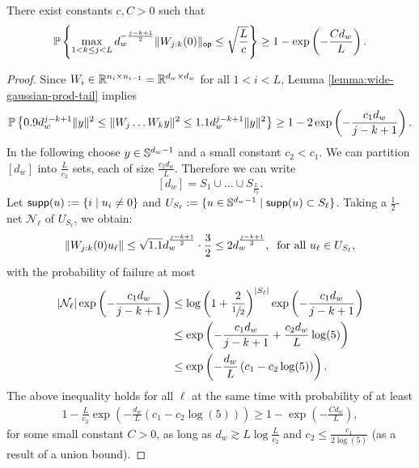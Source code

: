\begin{lemma}
	\label{lemma:norm-product-bounded}
	There exist constants $c,C > 0$ such that
	\begin{equation}
		\mathbb{P}\left\{ {
			\max_{1 < k \leq j < L}
			d_{w}^{-\frac{j - k + 1}{2}} \lVert W_{j:k}(0)\rVert_{\mathsf{op}} \leq
			\sqrt{\frac{L}{c}}
		} \right\} \geq
		1 - \exp\left(
		-\frac{C d_w}{L}
		\right).
		\label{eq:norm-product-bounded-uniform}
	\end{equation}
\end{lemma}
\begin{proof}
	Since $W_{i} \in \mathbb{R}^{n_i \times n_{i-1}}=\mathbb{R}^{d_w \times d_w}$ for all $1 <i < L$,
	Lemma \ref{lemma:wide-gaussian-prod-tail} implies
	\[
		\mathbb{P}\left\{ {0.9 d_w^{j-k+1} \lVert y\rVert^2 \leq \lVert W_j \dots W_k y\rVert^2 \leq 1.1 d_w^{j-k+1} \lVert y\rVert^2} \right\} \geq 1 - 2 \exp\left(
		-\frac{c_1 d_w}{j - k + 1}
		\right).
	\]
	In the following choose $y \in \mathbb{S}^{d_w-1}$ and a small constant $c_2 < c_1$. We can partition $[d_w]$ into $\frac{L}{c_2}$ sets, each of size $ \frac{c_2 d_w}{L}$. Therefore we can write 
	\[
		[d_w] = S_1 \cup \dots \cup S_{\frac{L}{c_2}}.
	\]
  Let $\mathsf{supp}(u):=\{i \mid u_i \neq 0 \}$ and $U_{S_\ell} := \{u \in \mathbb{S}^{d_w-1} \mid \mathsf{supp}(u) \subset S_\ell\}$.
  Taking a $\frac{1}{2}$-net $\mathcal{N}_{\ell}$ of $U_{S_{\ell}}$, we obtain:
	\begin{align*}
		\lVert W_{j:k}(0)u_{\ell}\rVert \leq \sqrt{1.1} d_w^{\frac{j-k+1}{2}} \cdot \frac{3}{2} \leq 2 d_w^{\frac{j-k+1}{2}}, \;\; \text{for all $u_{\ell} \in U_{S_\ell}$},
	\end{align*}
	with the probability of failure at most
	\begin{align*}
		\lvert\mathcal{N}_{\ell}\rvert \exp\left(-\frac{c_1 d_{w}}{j - k + 1}\right) & \leq
		\log\left(1 + \frac{2}{\sfrac{1}{2}}\right)^{\lvert S_{\ell}\rvert}
		\exp\left(-\frac{c_1 d_{w}}{j - k + 1}\right)                         \\
		                                                               & \leq
		\exp\left(
		- \frac{c_1 d_{w}}{j - k + 1} + \frac{c_2 d_{w}}{L} \log(5)
		\right)                                                               \\
		                                                               & \leq
		\exp\left(
		- \frac{d_{w}}{L} \left(c_1 - c_2 \log(5)\right)
		\right).
	\end{align*}
	The above inequality holds for all $\ell$ at the same time with probability of at least
	\begin{align*}
		1 - \frac{L}{c_2} \exp\left(-\frac{d_{w}}{L}(c_1 - c_2 \log(5))\right)
		\geq 1 - \exp\left(-\frac{C d_w}{L}\right),
	\end{align*}
	for some small constant $C > 0$, as long as $d_{w} \gtrsim L \log \frac{L}{c_2}$ and
	$c_2 \leq \frac{c_1}{2 \log(5)}$ (as a result of a union bound).
    

\end{proof}
